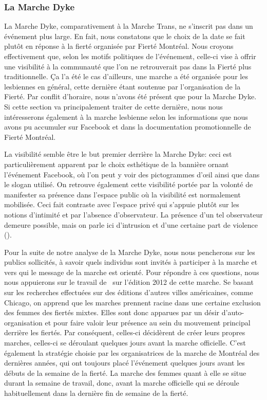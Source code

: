 \subsubsection{La Marche Dyke}
\label{subsubsec:marchedyke}
La Marche Dyke, comparativement à la Marche Trans, ne s'inscrit pas dans un événement plus large.
En fait, nous constatons que le choix de la date se fait plutôt en réponse à la fierté organisée par Fierté Montréal.
Nous croyons effectivement que, selon les motifs politiques de l'événement, celle-ci vise à offrir une visibilité à la communauté \dyke{} que l'on ne retrouverait pas dans la Fierté plus traditionnelle.
Ça l'a été le cas d'ailleurs, une marche a été organisée pour les lesbiennes en général, cette dernière étant soutenue par l'organisation de la Fierté.
Par conflit d'horaire, nous n'avons été présent que pour la Marche Dyke.
Si cette section va principalement traiter de cette dernière, nous nous intéresserons également à la marche lesbienne selon les informations que nous avons pu accumuler sur Facebook et dans la documentation promotionnelle de Fierté Montréal.

La visibilité semble être le but premier derrière la Marche Dyke: ceci est particulièrement apparent par le choix esthétique de la bannière ornant l'événement Facebook, où l'on peut y voir des pictogrammes d'œil ainsi que dans le slogan utilisé.
On retrouve également cette visibilité portée par la volonté de manifester sa présence dans l'espace public où la visibilité est normalement mobilisée.
Ceci fait contraste avec l'espace privé qui s'appuie plutôt sur les notions d'intimité et par l'absence d'observateur.
La présence d'un tel observateur demeure possible, mais on parle  ici d'intrusion et d'une certaine part de violence ().

Pour la suite de notre analyse de la Marche Dyke, nous nous pencherons sur les publics sollicités, à savoir quels individus sont invités à participer à la marche et vers qui le message de la marche est orienté.
Pour répondre à ces questions, nous nous appuierons sur le travail de~\cite{Podmore2015a} sur l'édition 2012 de cette marche.
Se basant sur les recherches effectuées sur des éditions d'autres villes américaines, comme Chicago, on apprend que les marches \dykes{} prennent racine dans une certaine exclusion des femmes des fiertés mixtes.
Elles sont donc apparues par un désir d'auto-organisation et pour faire valoir leur présence au sein du mouvement principal derrière les fiertés.
Par conséquent, celles-ci décidèrent de créer leurs propres marches, celles-ci se déroulant quelques jours avant la marche officielle.
C'est également la stratégie choisie par les organisatrices de la marche de Montréal des dernières années, qui ont toujours placé l'événement quelques jours avant les débuts de la semaine de la fierté.
La marche des femmes quant à elle se situe durant la semaine de travail, donc, avant la marche officielle qui se déroule habituellement dans la dernière fin de semaine de la fierté.

